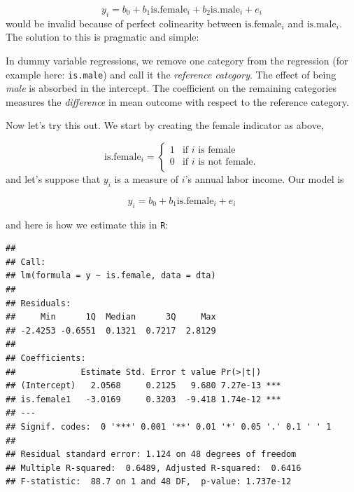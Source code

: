 \documentclass[]{book}
\newenvironment{Shaded}{\begin{snugshade}}{\end{snugshade}}
\newcommand{\KeywordTok}[1]{\textcolor[rgb]{0.13,0.29,0.53}{\textbf{#1}}}
\newcommand{\StringTok}[1]{\textcolor[rgb]{0.31,0.60,0.02}{#1}}
\newcommand{\CommentTok}[1]{\textcolor[rgb]{0.56,0.35,0.01}{\textit{#1}}}
\newcommand{\OperatorTok}[1]{\textcolor[rgb]{0.81,0.36,0.00}{\textbf{#1}}}
\newcommand{\NormalTok}[1]{#1}
\newenvironment{tip}{\begin{tcolorbox}[colback=green!5!white,colframe=green]}{\end{tcolorbox}}
\begin{document}
\[
y_i = b_0 + b_1 \text{is.female}_i + b_2 \text{is.male}_i + e_i
\] would be invalid because of perfect colinearity between
\(\text{is.female}_i\) and \(\text{is.male}_i\). The solution to this is
pragmatic and simple:

\begin{tip}
In dummy variable regressions, we remove one category from the
regression (for example here: \texttt{is.male}) and call it the
\emph{reference category}. The effect of being \emph{male} is absorbed
in the intercept. The coefficient on the remaining categories measures
the \emph{difference} in mean outcome with respect to the reference
category.
\end{tip}

Now let's try this out. We start by creating the female indicator as
above,

\[
\text{is.female}_i = \begin{cases}
          1 & \text{if }i\text{ is female} \\
            0 & \text{if }i\text{ is not female}. \\
   \end{cases}
\] and let's suppose that \(y_i\) is a measure of \(i\)'s annual labor
income. Our model is

\begin{equation}
y_i = b_0 + b_1 \text{is.female}_i + e_i \label{eq:dummy-reg}
\end{equation}

and here is how we estimate this in \texttt{R}:

\begin{Shaded}
\end{Shaded}

\begin{verbatim}
## 
## Call:
## lm(formula = y ~ is.female, data = dta)
## 
## Residuals:
##     Min      1Q  Median      3Q     Max 
## -2.4253 -0.6551  0.1321  0.7217  2.8129 
## 
## Coefficients:
##             Estimate Std. Error t value Pr(>|t|)    
## (Intercept)   2.0568     0.2125   9.680 7.27e-13 ***
## is.female1   -3.0169     0.3203  -9.418 1.74e-12 ***
## ---
## Signif. codes:  0 '***' 0.001 '**' 0.01 '*' 0.05 '.' 0.1 ' ' 1
## 
## Residual standard error: 1.124 on 48 degrees of freedom
## Multiple R-squared:  0.6489, Adjusted R-squared:  0.6416 
## F-statistic:  88.7 on 1 and 48 DF,  p-value: 1.737e-12
\end{verbatim}
\end{document}

